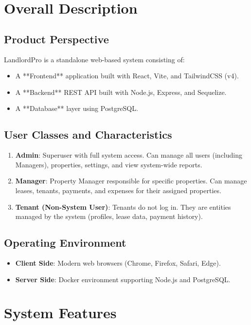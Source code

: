 \documentclass[12pt,a4paper]{article}
\begin{document}
\section{Overall Description}

\subsection{Product Perspective}
LandlordPro is a standalone web-based system consisting of:
\begin{itemize}
    \item A **Frontend** application built with React, Vite, and TailwindCSS (v4).
    \item A **Backend** REST API built with Node.js, Express, and Sequelize.
    \item A **Database** layer using PostgreSQL.
\end{itemize}

\subsection{User Classes and Characteristics}
\begin{enumerate}
    \item \textbf{Admin}: Superuser with full system access. Can manage all users (including Managers), properties, settings, and view system-wide reports.
    \item \textbf{Manager}: Property Manager responsible for specific properties. Can manage leases, tenants, payments, and expenses for their assigned properties.
    \item \textbf{Tenant (Non-System User)}: Tenants do not log in. They are entities managed by the system (profiles, lease data, payment history).
\end{enumerate}

\subsection{Operating Environment}
\begin{itemize}
    \item \textbf{Client Side}: Modern web browsers (Chrome, Firefox, Safari, Edge).
    \item \textbf{Server Side}: Docker environment supporting Node.js and PostgreSQL.
\end{itemize}

\section{System Features}
\end{document}
